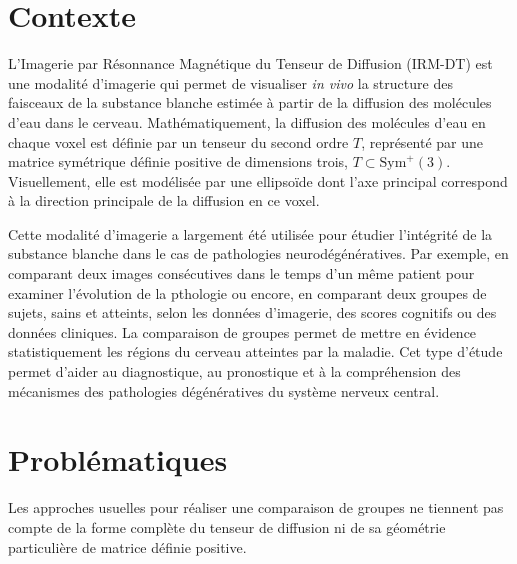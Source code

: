 


\section*{Contexte}
L'Imagerie par Résonnance Magnétique du Tenseur de Diffusion (IRM-DT) est une modalité d'imagerie qui permet de visualiser \textit{in vivo} la structure des faisceaux de la substance blanche estimée à partir de la diffusion des molécules d'eau dans le cerveau.
Mathématiquement, la diffusion des molécules d'eau en chaque voxel est définie par un tenseur du second ordre $T$, représenté par une matrice symétrique définie positive de dimensions trois, $T \subset \mbox{Sym}^+(3)$. Visuellement, elle est modélisée par une ellipsoïde dont l'axe principal correspond à la direction principale de la diffusion en ce voxel.

Cette modalité d'imagerie a largement été utilisée pour étudier l'intégrité de la substance blanche dans le cas de pathologies neurodégénératives. Par exemple, en comparant deux images consécutives dans le temps d'un même patient pour examiner l'évolution de la pthologie ou encore, en comparant deux groupes de sujets, sains et atteints, selon les données d'imagerie, des scores cognitifs ou des données cliniques.
La comparaison de groupes permet de mettre en évidence statistiquement les régions du cerveau atteintes par la maladie. Cet type d'étude permet d'aider au diagnostique, au pronostique et à la compréhension des mécanismes des pathologies dégénératives du système nerveux central.



\section*{Problématiques}
Les approches usuelles pour réaliser une comparaison de groupes ne tiennent pas compte de la forme complète du tenseur de diffusion ni de sa géométrie particulière de matrice définie positive.


